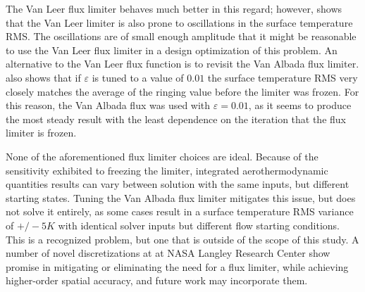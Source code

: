 The Van Leer flux limiter behaves much better in this regard; however,
 shows that the Van Leer limiter is also prone to
oscillations in the surface temperature RMS.  The oscillations are of small
enough amplitude that it might be reasonable to use the Van Leer flux limiter in
a design optimization of this problem.  An alternative to the Van Leer flux
function is to revisit the Van Albada flux limiter.  
also shows that if $\varepsilon$ is tuned to a value of $0.01$ the surface
temperature RMS very closely matches the average of the ringing value before the
limiter was frozen.  For this reason, the Van Albada flux was used with
$\varepsilon = 0.01$, as it seems to produce the most steady result with the
least dependence on the iteration that the flux limiter is frozen.

None of the aforementioned flux limiter choices are ideal.  Because of the
sensitivity exhibited to freezing the limiter, integrated aerothermodynamic
quantities results can vary between solution with the same inputs, but different
starting states.  Tuning the Van Albada flux limiter mitigates this issue, but
does not solve it entirely, as some cases result in a surface temperature RMS
variance of $+/- 5 K$ with identical solver inputs but different flow starting
conditions. This is a recognized problem, but one that is outside of the scope
of this study.  A number of novel discretizations at at NASA Langley Research
Center\cite{gnoffo2014global,mazaheri2014very,mazaheri2016high} show promise in
mitigating or eliminating the need for a flux limiter, while achieving
higher-order spatial accuracy, and future work may incorporate them.
